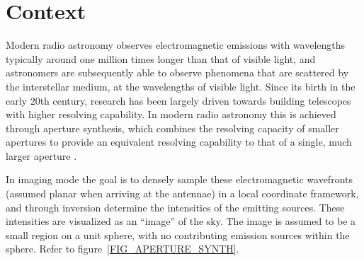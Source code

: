 \documentclass[a4paper, two column]{article}
\begin{document}
\saythanks
\section{Context}
Modern radio astronomy observes electromagnetic emissions with wavelengths typically around one million times longer than that of visible light, and astronomers are subsequently 
able to observe phenomena that are scattered by the interstellar medium, at the wavelengths of visible light. Since its birth in the early 20th century, research has been largely 
driven towards building telescopes with higher resolving capability. In modern radio astronomy this is achieved through aperture synthesis, which combines the resolving capacity 
of smaller apertures to provide an equivalent resolving capability to that of a single, much larger aperture \cite{christiansenradiotelescopes}.

In imaging mode the goal is to densely sample these electromagnetic wavefronts (assumed planar when arriving at the antennae) in a local coordinate framework, and through inversion 
determine the intensities of the emitting sources. These intensities are visualized as an ``image'' of the sky. The image is assumed to be a small region on a unit sphere, with no 
contributing emission sources within the sphere. Refer to figure~\ref{FIG_APERTURE_SYNTH}.
\end{document}
